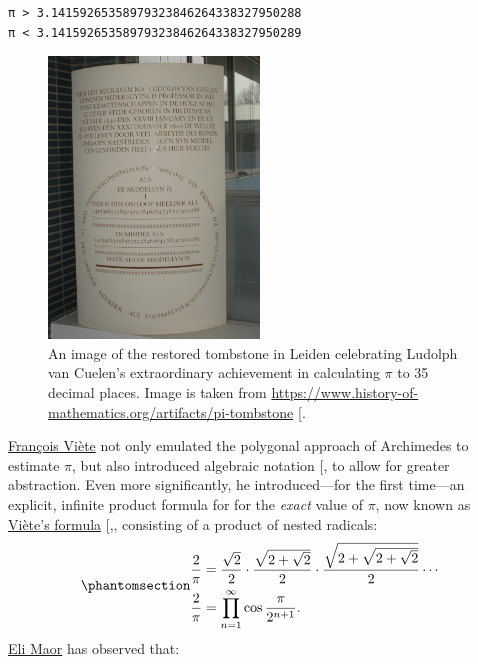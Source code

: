 \documentclass[
  a4paper,
]{article}
\begin{document}
\begin{verbatim}
π > 3.14159265358979323846264338327950288
π < 3.14159265358979323846264338327950289
\end{verbatim}

\begin{figure}
\centering
\includegraphics[width=0.5\textwidth,height=\textheight]{images/van-ceulen-restored-tombstone.jpg}
\caption{An image of the restored tombstone in Leiden celebrating
Ludolph van Cuelen's extraordinary achievement in calculating \(\pi\) to
35 decimal places. Image is taken from
\url{https://www.history-of-mathematics.org/artifacts/pi-tombstone}
{[}\citeproc{ref-tombstone}{12}{]}.}\label{fig:memorial}
\end{figure}

\href{https://en.wikipedia.org/wiki/Fran\%C3\%A7ois_Vi\%C3\%A8te}{François
Viète} not only emulated the polygonal approach of Archimedes to
estimate \(\pi\), but also introduced algebraic notation
{[},\citeproc{ref-maor1998}{14}{]} to allow for
greater abstraction. Even more significantly, he introduced---for the
first time---an explicit, infinite product formula for for the
\emph{exact} value of \(\pi\), now known as
\href{https://en.wikipedia.org/wiki/Vi\%C3\%A8te\%27s_formula}{Viète's
formula}
{[},\citeproc{ref-viete-formula}{15}{]},
consisting of a product of nested radicals:
\begin{equation}\phantomsection\label{eq:viete}{
\begin{aligned}
\frac2\pi &= \frac{\sqrt 2}2 \cdot \frac{\sqrt{2+\sqrt 2}}2 \cdot \frac{\sqrt{2+\sqrt{2+\sqrt 2}}}2 \cdots\\
\frac2\pi &= \prod_{n=1}^{\infty} \cos \frac{\pi}{2^{n+1}}.
\end{aligned}
}\end{equation} \href{https://en.wikipedia.org/wiki/Eli_Maor}{Eli Maor}
has observed that:
\end{document}
